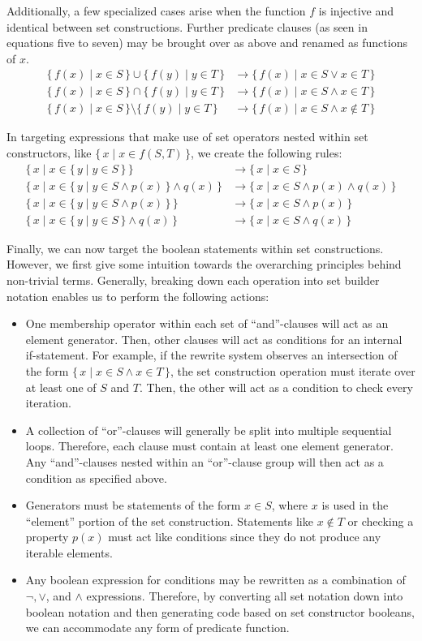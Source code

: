 \documentclass{article}
\newcommand{\Set}[2]{%
  \{\, #1 \mid #2 \, \}%
}
\begin{document}
Additionally, a few specialized cases arise when the function $f$ is injective and identical between set constructions. Further predicate clauses (as seen in equations five to seven) may be brought over as above and renamed as functions of $x$.
\begin{align}
  \Set{f(x)}{x \in S} \cup \Set{f(y)}{y \in T} &\rightarrow \Set{f(x)}{x \in S \lor x \in T}\\
  \Set{f(x)}{x \in S} \cap \Set{f(y)}{y \in T} &\rightarrow \Set{f(x)}{x \in S \land x \in T}\\
  \Set{f(x)}{x \in S} \setminus \Set{f(y)}{y \in T} &\rightarrow \Set{f(x)}{x \in S \land x \notin T}
\end{align}

In targeting expressions that make use of set operators nested within set constructors, like $\Set{x}{x \in f(S, T)}$, we create the following rules:
\begin{align}
  \Set{x}{x \in \Set{y}{y \in S}} &\rightarrow \Set{x}{x \in S}\\
  \Set{x}{x \in \Set{y}{y \in S \land p(x)} \land q(x)} &\rightarrow \Set{x}{x \in S \land p(x) \land q(x)}\\
  \Set{x}{x \in \Set{y}{y \in S \land p(x)}} &\rightarrow \Set{x}{x \in S \land p(x)}\\
  \Set{x}{x \in \Set{y}{y \in S} \land q(x)} &\rightarrow \Set{x}{x \in S \land q(x)}
\end{align}

Finally, we can now target the boolean statements within set constructions. However, we first give some intuition towards the overarching principles behind non-trivial terms. Generally, breaking down each operation into set builder notation enables us to perform the following actions:
\begin{itemize}
  \item One membership operator within each set of ``and''-clauses will act as an element generator. Then, other clauses will act as conditions for an internal if-statement. For example, if the rewrite system observes an intersection of the form $\Set{x}{x \in S \land x \in T}$, the set construction operation must iterate over at least one of $S$ and $T$. Then, the other will act as a condition to check every iteration.
  \item A collection of ``or''-clauses will generally be split into multiple sequential loops. Therefore, each clause must contain at least one element generator. Any ``and''-clauses nested within an ``or''-clause group will then act as a condition as specified above.
  \item Generators must be statements of the form $x \in S$, where $x$ is used in the ``element'' portion of the set construction. Statements like $x \notin T$ or checking a property $p(x)$ must act like conditions since they do not produce any iterable elements.
  \item Any boolean expression for conditions may be rewritten as a combination of $\lnot, \lor$, and $\land$ expressions. Therefore, by converting all set notation down into boolean notation and then generating code based on set constructor booleans, we can accommodate any form of predicate function.
\end{itemize}
\end{document}
